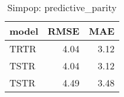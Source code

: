 \begin{table}[ht]
\centering
\begin{tabular}{lrr}
  \hline
model & RMSE & MAE \\ 
  \hline
TRTR & 4.04 & 3.12 \\ 
  TSTR & 4.04 & 3.12 \\ 
  TSTR & 4.49 & 3.48 \\ 
   \hline
\end{tabular}
\caption{Simpop: predictive_parity} 
\end{table}
